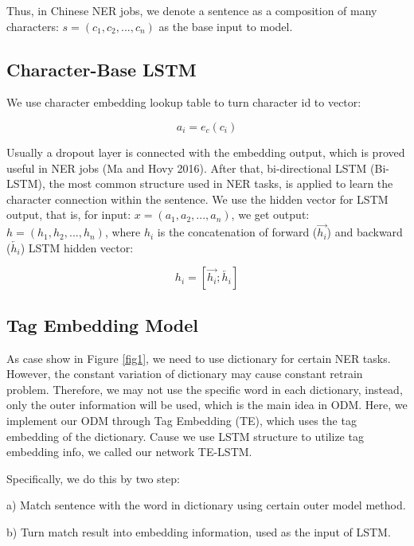 \documentclass[letterpaper]{article} %
\begin{document}
Thus, in Chinese NER jobs, we denote a sentence as a composition of many characters: $s = (c_1, c_2, ..., c_n) $ as the base input to model.

\subsection{Character-Base LSTM}

We use character embedding lookup table to turn character id to vector:

\begin{equation}
a_i = e_c(c_i) \label{char_embedding}
\end{equation}

Usually a dropout layer is connected with the embedding output, which is proved useful in NER jobs (Ma and Hovy 2016). After that, bi-directional LSTM (Bi-LSTM), the most common structure used in NER tasks, is applied to learn the character connection within the sentence. We use the hidden vector for LSTM output, that is, for input: $x = (a_1, a_2, ..., a_n) $,  we get output: $h = (h_1, h_2, ..., h_n)$, where $h_i$ is the concatenation of forward ($\overrightarrow{h_i}$) and backward ($\overleftarrow{h_i}$) LSTM hidden vector:

\begin{equation}
h_i = [\overrightarrow{h_i};\overleftarrow{h_i}] \label{lstm_out}
\end{equation}

\subsection{Tag Embedding Model}

As case show in Figure \ref{fig1}, we need to use dictionary for certain NER tasks. However, the constant variation of dictionary may cause constant retrain problem. Therefore, we may not use the specific word in each dictionary, instead, only the outer information will be used, which is the main idea in ODM. Here, we implement our ODM through Tag Embedding (TE), which uses the tag embedding of the dictionary. Cause we use LSTM structure to utilize tag embedding info, we called our network  TE-LSTM.

Specifically, we do this by two step: 

a)  Match sentence with the word in dictionary using certain outer model method.

b)  Turn match result into embedding information, used as the input of LSTM.
\end{document}
